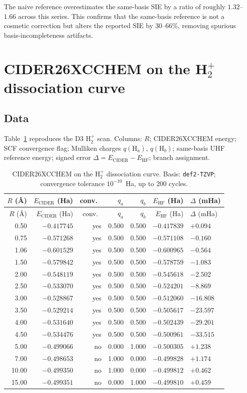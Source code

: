 \documentclass[11pt]{report}
\theoremstyle{definition}
\theoremstyle{remark}
\newcommand{\EHF}{E_{\mathrm{HF}}}
\newcommand{\ECD}{E_{\mathrm{CIDER}}}
\begin{document}
The naive reference overestimates the same-basis SIE by a ratio of
roughly $1.32$--$1.66$ across this series. This confirms that
the same-basis reference is not a cosmetic correction but alters the
reported SIE by 30--66\%, removing spurious basis-incompleteness artifacts.

\section{CIDER26XCCHEM on the H$_2^+$ dissociation curve}

\subsection{Data}

Table~\ref{tab:h2plus} reproduces the D3 H$_2^+$ scan. Columns:
$R$; CIDER26XCCHEM energy; SCF convergence flag; Mulliken charges
$q(\mathrm H_a)$, $q(\mathrm H_b)$; same-basis UHF reference energy;
signed error $\Delta = \ECD - \EHF$; branch assignment.

\begin{longtable}{rrrrrrl}
\caption{CIDER26XCCHEM on the H$_2^+$ dissociation curve. Basis:
\texttt{def2-TZVP}; convergence tolerance $10^{-10}$~Ha, up to 200 cycles.
\label{tab:h2plus}}\\
\toprule
$R$ (\AA) & $\ECD$ (Ha) & conv.\ & $q_a$ & $q_b$ & $\EHF$ (Ha) & $\Delta$ (mHa) \\
\midrule
\endfirsthead
\toprule
$R$ (\AA) & $\ECD$ (Ha) & conv.\ & $q_a$ & $q_b$ & $\EHF$ (Ha) & $\Delta$ (mHa) \\
\midrule
\endhead
0.50  & $-0.417745$ & yes & 0.500 & 0.500 & $-0.417839$ & $+0.094$ \\
0.75  & $-0.571268$ & yes & 0.500 & 0.500 & $-0.571108$ & $-0.160$ \\
1.06  & $-0.601529$ & yes & 0.500 & 0.500 & $-0.600965$ & $-0.564$ \\
1.50  & $-0.579842$ & yes & 0.500 & 0.500 & $-0.578759$ & $-1.083$ \\
2.00  & $-0.548119$ & yes & 0.500 & 0.500 & $-0.545618$ & $-2.502$ \\
2.50  & $-0.533070$ & yes & 0.500 & 0.500 & $-0.524201$ & $-8.869$ \\
3.00  & $-0.528867$ & yes & 0.500 & 0.500 & $-0.512060$ & $-16.808$ \\
3.50  & $-0.529214$ & yes & 0.500 & 0.500 & $-0.505617$ & $-23.597$ \\
4.00  & $-0.531640$ & yes & 0.500 & 0.500 & $-0.502439$ & $-29.201$ \\
4.50  & $-0.534476$ & yes & 0.500 & 0.500 & $-0.500961$ & $-33.515$ \\
5.00  & $-0.499066$ & no  & 0.000 & 1.000 & $-0.500305$ & $+1.238$ \\
7.00  & $-0.498653$ & no  & 1.000 & 0.000 & $-0.499828$ & $+1.174$ \\
10.00 & $-0.499350$ & no  & 1.000 & 0.000 & $-0.499812$ & $+0.462$ \\
15.00 & $-0.499351$ & no  & 0.000 & 1.000 & $-0.499810$ & $+0.459$ \\
\bottomrule
\end{longtable}
\end{document}

